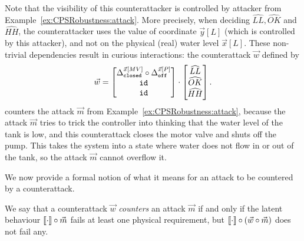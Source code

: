 {\begin{example}
  Note that the visibility of this counterattacker is controlled by attacker from Example~\ref{ex:CPSRobustness:attack}. More precisely, when deciding $\widehat{LL},\widehat{OK}$ and $\widehat{HH}$, the counterattacker uses the value of coordinate $\vec{y}[L]$ (which is controlled by this attacker), and not on the physical (real) water level $\vec{x}[L]$. These non-trivial dependencies result in curious interactions:
  the counterattack $\vec{w}$ defined by
  \begin{align}
    \vec{w}=
    \begin{bmatrix}
      {\Delta}^{\vec{x}[MV]}_{\texttt{closed}} \circ {\Delta}^{\vec{x}[P]}_{\texttt{off}} \\
      {\texttt{id}} \\
      {\texttt{id}}
    \end{bmatrix}
    \cdot
    \begin{bmatrix}
      \widehat{LL} \\
      \widehat{OK}\\
      \widehat{HH}
    \end{bmatrix}.
  \end{align}
counters the attack $\vec{m}$ from Example~\ref{ex:CPSRobustness:attack}, because the attack $\vec{m}$ tries to trick the controller into thinking that the water level of the tank is low, and this counterattack closes the motor valve and shuts off the pump. This takes the system into a state where water does not flow in or out of the tank, so the attack $\vec{m}$ cannot overflow it.
\end{example}
We now provide a formal notion of what it means for an attack to be countered by a counterattack.
\begin{definition}
  We say that a counterattack $\vec{w}$ \emph{counters} an attack $\vec{m}$ if and only if the latent behaviour ${{{\llbracket\cdot\rrbracket}}}\circ\vec{m}$ fails at least one physical requirement, but ${{{\llbracket\cdot\rrbracket}}}\circ(\vec{w}\circ\vec{m})$ does not fail any.
\end{definition}

}
